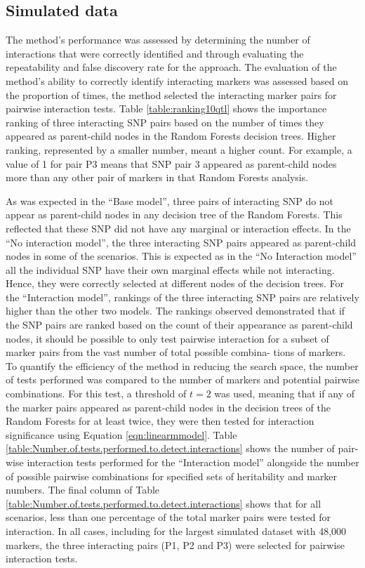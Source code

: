 \documentclass[preprint,12pt,3p]{elsarticle}
\begin{document}
\subsection{Simulated data}
The method's performance was assessed by determining the number of interactions that were correctly identified and
through evaluating the repeatability and false discovery rate for the approach.  The evaluation of the method's ability
to correctly identify interacting markers was assessed based on the proportion of times, the method selected the
interacting marker pairs for pairwise interaction tests. Table  \ref{table:ranking10qtl} shows the importance ranking of three interacting SNP
pairs based on the number of times they appeared as parent-child nodes in the Random Forests decision trees. Higher
ranking, represented by a smaller number, meant a higher count.  For example, a value of 1 for pair P3 means that SNP
pair 3 appeared as parent-child nodes more than any other pair of markers in that Random Forests analysis.


As was expected in the ``Base model'', three pairs of interacting SNP do not appear as parent-child nodes in any decision
tree of the Random Forests. This reflected that these SNP did not have any marginal or interaction effects. In the ``No
interaction model'', the three interacting SNP pairs appeared as parent-child nodes in some of the scenarios. This is
expected as in the ``No Interaction model'' all the individual SNP have their own marginal effects while not
interacting. Hence, they were correctly selected at different nodes of the decision trees.  For the ``Interaction model'',
rankings of the three interacting SNP pairs are relatively higher than the other two models. The rankings observed
demonstrated that if the SNP pairs are ranked based on the count of their appearance as parent-child nodes, it should be
possible to only test pairwise interaction for a subset of marker pairs from the vast number of total possible combina-
tions of markers.  To quantify the efficiency of the method in reducing the search space, the number of tests performed
was compared to the number of markers and potential pairwise combinations. For this test, a threshold of $t = 2$ was
used, meaning that if any of the marker pairs appeared as parent-child nodes in the decision trees of the Random Forests
for at least twice, they were then tested for interaction significance using Equation \ref{eqn:linearmmodel}. Table  \ref{table:Number.of.tests.performed.to.detect.interactions} shows the number of
pair-wise interaction tests performed for the ``Interaction model'' alongside the number of possible pairwise combinations
for specified sets of heritability and marker numbers. The final column of Table  \ref{table:Number.of.tests.performed.to.detect.interactions} shows that for all scenarios, less
than one percentage of the total marker pairs were tested for interaction.  In all cases, including for the largest
simulated dataset with 48,000 markers, the three interacting pairs (P1, P2 and P3) were selected for pairwise
interaction tests.
\end{document}
